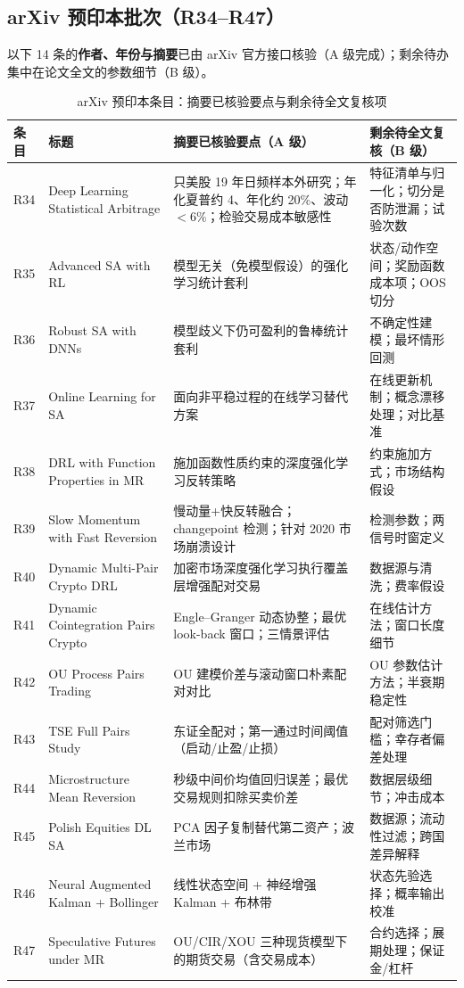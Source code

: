 \subsection{arXiv 预印本批次（R34--R47）}

以下 14 条的\textbf{作者、年份与摘要}已由 arXiv 官方接口核验（A 级完成）；剩余待办集中在论文全文的参数细节（B 级）。

\begin{table}[htbp]
\centering
\caption{arXiv 预印本条目：摘要已核验要点与剩余待全文复核项}
\label{tab:checklist_arxiv}
\footnotesize
\begin{tabular}{@{}>{\raggedright\arraybackslash}p{1.4cm}>{\raggedright\arraybackslash}p{3.5cm}>{\raggedright\arraybackslash}p{5.1cm}>{\raggedright\arraybackslash}p{4.4cm}@{}}
\toprule
条目 & 标题 & 摘要已核验要点（A 级） & 剩余待全文复核（B 级） \\
\midrule
R34 & Deep Learning Statistical Arbitrage & 500 只美股 19 年日频样本外研究；年化夏普约 4、年化约 20\%、波动 $<6\%$；检验交易成本敏感性 & 特征清单与归一化；切分是否防泄漏；试验次数 \\
R35 & Advanced SA with RL & 模型无关（免模型假设）的强化学习统计套利 & 状态/动作空间；奖励函数成本项；OOS 切分 \\
R36 & Robust SA with DNNs & 模型歧义下仍可盈利的鲁棒统计套利 & 不确定性建模；最坏情形回测 \\
R37 & Online Learning for SA & 面向非平稳过程的在线学习替代方案 & 在线更新机制；概念漂移处理；对比基准 \\
R38 & DRL with Function Properties in MR & 施加函数性质约束的深度强化学习反转策略 & 约束施加方式；市场结构假设 \\
R39 & Slow Momentum with Fast Reversion & 慢动量+快反转融合；changepoint 检测；针对 2020 市场崩溃设计 & 检测参数；两信号时窗定义 \\
R40 & Dynamic Multi-Pair Crypto DRL & 加密市场深度强化学习执行覆盖层增强配对交易 & 数据源与清洗；费率假设 \\
R41 & Dynamic Cointegration Pairs Crypto & Engle--Granger 动态协整；最优 look-back 窗口；三情景评估 & 在线估计方法；窗口长度细节 \\
R42 & OU Process Pairs Trading & OU 建模价差与滚动窗口朴素配对对比 & OU 参数估计方法；半衰期稳定性 \\
R43 & TSE Full Pairs Study & 东证全配对；第一通过时间阈值（启动/止盈/止损） & 配对筛选门槛；幸存者偏差处理 \\
R44 & Microstructure Mean Reversion & 秒级中间价均值回归误差；最优交易规则扣除买卖价差 & 数据层级细节；冲击成本 \\
R45 & Polish Equities DL SA & PCA 因子复制替代第二资产；波兰市场 & 数据源；流动性过滤；跨国差异解释 \\
R46 & Neural Augmented Kalman + Bollinger & 线性状态空间 + 神经增强 Kalman + 布林带 & 状态先验选择；概率输出校准 \\
R47 & Speculative Futures under MR & OU/CIR/XOU 三种现货模型下的期货交易（含交易成本） & 合约选择；展期处理；保证金/杠杆 \\
\bottomrule
\end{tabular}
\end{table}

